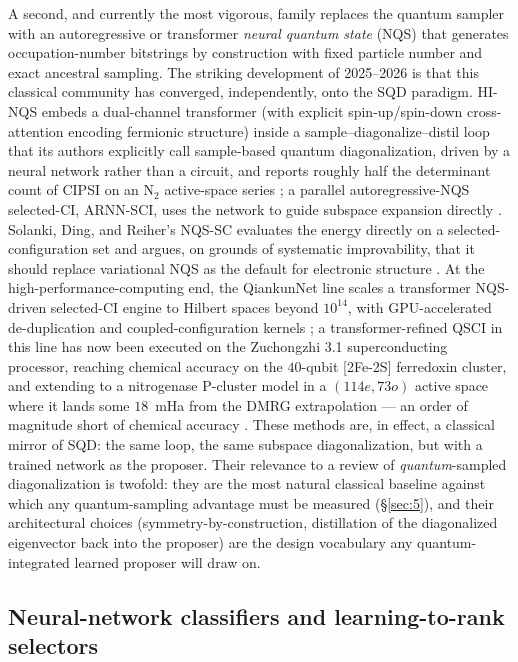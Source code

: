 \documentclass[onecolumn,a4paper]{quantumarticle}
\begin{document}
A second, and currently the most vigorous, family replaces the quantum sampler with an autoregressive or transformer \emph{neural quantum state} (NQS) \cite{carleo2017} that generates occupation-number bitstrings by construction with fixed particle number and exact ancestral sampling. The striking development of 2025--2026 is that this classical community has converged, independently, onto the SQD paradigm. HI-NQS embeds a dual-channel transformer (with explicit spin-up/spin-down cross-attention encoding fermionic structure) inside a sample--diagonalize--distil loop that its authors explicitly call sample-based quantum diagonalization, driven by a neural network rather than a circuit, and reports roughly half the determinant count of CIPSI on an N$_2$ active-space series \cite{chang2026}; a parallel autoregressive-NQS selected-CI, ARNN-SCI, uses the network to guide subspace expansion directly \cite{thompson2026}. Solanki, Ding, and Reiher's NQS-SC evaluates the energy directly on a selected-configuration set and argues, on grounds of systematic improvability, that it should replace variational NQS as the default for electronic structure \cite{solanki2026}. At the high-performance-computing end, the QiankunNet line scales a transformer NQS-driven selected-CI engine to Hilbert spaces beyond $10^{14}$, with GPU-accelerated de-duplication and coupled-configuration kernels \cite{shang2025,sun2026}; a transformer-refined QSCI in this line has now been executed on the Zuchongzhi 3.1 superconducting processor, reaching chemical accuracy on the $40$-qubit [2Fe-2S] ferredoxin cluster, and extending to a nitrogenase P-cluster model in a $(114e,73o)$ active space where it lands some $18$~mHa from the DMRG extrapolation --- an order of magnitude short of chemical accuracy \cite{zeng2026}. These methods are, in effect, a classical mirror of SQD: the same loop, the same subspace diagonalization, but with a trained network as the proposer. Their relevance to a review of \emph{quantum}-sampled diagonalization is twofold: they are the most natural classical baseline against which any quantum-sampling advantage must be measured (\S\ref{sec:5}), and their architectural choices (symmetry-by-construction, distillation of the diagonalized eigenvector back into the proposer) are the design vocabulary any quantum-integrated learned proposer will draw on.


\subsection{Neural-network classifiers and learning-to-rank selectors}\label{sec:4-4}
\end{document}

